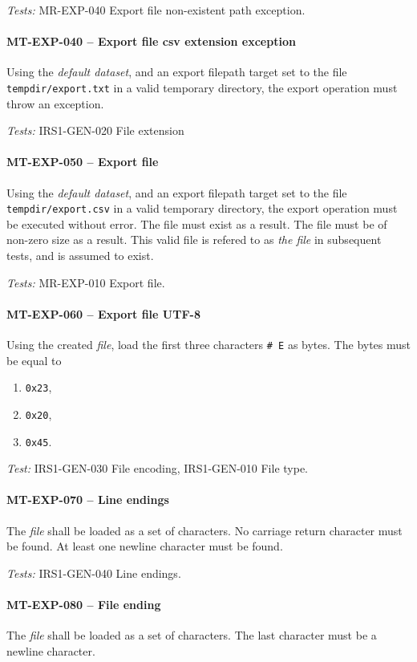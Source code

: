 \textit{Tests: } MR-EXP-040 Export file non-existent path exception.

\paragraph{MT-EXP-040 -- Export file csv extension exception}
Using the \emph{default dataset}, and an export filepath target
set to the file \lstinline{tempdir/export.txt} in a valid
temporary directory, the export operation must throw an exception.

\textit{Tests: } IRS1-GEN-020 File extension

\paragraph{MT-EXP-050 -- Export file}
Using the \emph{default dataset}, and an export filepath
target set to the file \lstinline{tempdir/export.csv} in a valid
temporary directory, the export operation must be executed
without error. The file must exist as a result. The file must
be of non-zero size as a result.
This valid file is refered to as \emph{the file} in subsequent tests,
and is assumed to exist.

\textit{Tests: } MR-EXP-010 Export file.

\paragraph{MT-EXP-060 -- Export file UTF-8}
Using the created \emph{file}, load the first three characters \lstinline{# E}
as bytes. The bytes must be equal to
\begin{enumerate}
\item \lstinline{0x23},
\item \lstinline{0x20},
\item \lstinline{0x45}.
\end{enumerate}

\textit{Test: } IRS1-GEN-030 File encoding, IRS1-GEN-010 File type.

\paragraph{MT-EXP-070 -- Line endings}
The \emph{file} shall be loaded as a set of characters.
No carriage return character must be found.
At least one newline character must be found.

\textit{Tests: } IRS1-GEN-040 Line endings.

\paragraph{MT-EXP-080 -- File ending}
The \emph{file} shall be loaded as a set of characters.
The last character must be a newline character.

